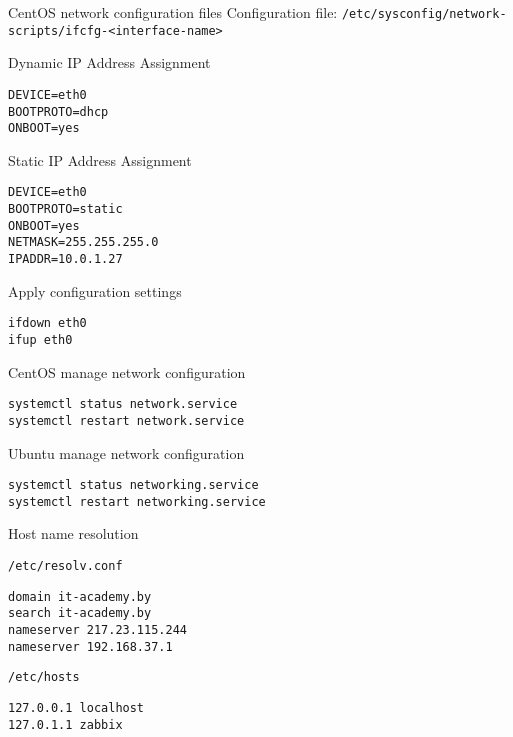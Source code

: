 \begin{frame}[fragile]{CentOS network configuration files}
Configuration file: {\tt /etc/sysconfig/network-scripts/ifcfg-<interface-name> }

\begin{block}{Dynamic IP Address Assignment}
    \begin{lstlisting}
DEVICE=eth0
BOOTPROTO=dhcp
ONBOOT=yes
    \end{lstlisting}
\end{block}

\begin{block}{Static IP Address Assignment}
    \begin{lstlisting}
DEVICE=eth0
BOOTPROTO=static
ONBOOT=yes
NETMASK=255.255.255.0
IPADDR=10.0.1.27
    \end{lstlisting}
\end{block}
\end{frame}

\begin{frame}[fragile]{Apply configuration settings}
    \begin{lstlisting}
ifdown eth0
ifup eth0
    \end{lstlisting}
    CentOS manage network configuration
    \begin{lstlisting}
systemctl status network.service
systemctl restart network.service
    \end{lstlisting}
    Ubuntu manage network configuration
    \begin{lstlisting}
systemctl status networking.service
systemctl restart networking.service
    \end{lstlisting}
\end{frame}


\begin{frame}[fragile]{Host name resolution}
\begin{block}{ {\tt /etc/resolv.conf}}
        \begin{lstlisting}
domain it-academy.by
search it-academy.by
nameserver 217.23.115.244
nameserver 192.168.37.1
        \end{lstlisting}
    \end{block}
\begin{block}{ {\tt /etc/hosts} }
        \begin{lstlisting}
127.0.0.1 localhost
127.0.1.1 zabbix
        \end{lstlisting}
\end{block}
\end{frame}
